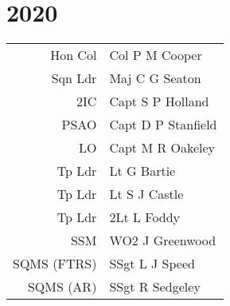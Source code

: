 \chapter*{2020}

\vspace*{10mm}

\begin{center}
  \small
  \begin{tabular}{rl}
    Hon Col & Col P M Cooper \\
    Sqn Ldr & Maj C G Seaton \\
    2IC & Capt S P Holland \\
    PSAO & Capt D P Stanfield \\
    LO & Capt M R Oakeley \\
    Tp Ldr & Lt G Bartie \\
    Tp Ldr & Lt S J Castle \\
    Tp Ldr & 2Lt L Foddy \\
    SSM & WO2 J Greenwood \\
    SQMS (FTRS) & SSgt L J Speed \\
    SQMS (AR) & SSgt R Sedgeley \\
  \end{tabular}
\end{center}

\vspace*{5mm}

